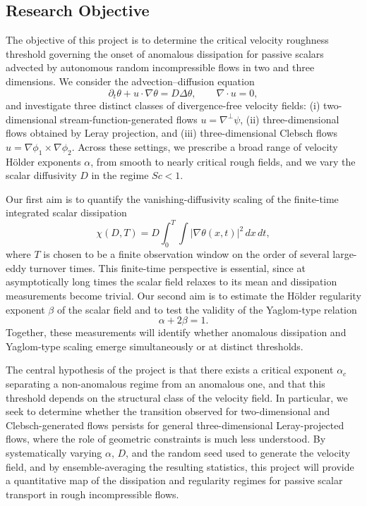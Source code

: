 \subsection*{Research Objective}

The objective of this project is to determine the critical velocity roughness threshold governing the onset of anomalous dissipation for passive scalars advected by autonomous random incompressible flows in two and three dimensions. We consider the advection--diffusion equation
\begin{equation}
\partial_t \theta + u\cdot \nabla \theta = D\Delta \theta,
\qquad \nabla\cdot u = 0,
\end{equation}
and investigate three distinct classes of divergence-free velocity fields: (i) two-dimensional stream-function-generated flows $u=\nabla^\perp\psi$, (ii) three-dimensional flows obtained by Leray projection, and (iii) three-dimensional Clebsch flows $u=\nabla\phi_1\times\nabla\phi_2$. Across these settings, we prescribe a broad range of velocity H\"older exponents $\alpha$, from smooth to nearly critical rough fields, and we vary the scalar diffusivity $D$ in the regime $Sc<1$.

Our first aim is to quantify the vanishing-diffusivity scaling of the finite-time integrated scalar dissipation
\begin{equation}
\chi(D,T)
=
D\int_0^T\int |\nabla\theta(x,t)|^2\,dx\,dt,
\end{equation}
where $T$ is chosen to be a finite observation window on the order of several large-eddy turnover times. This finite-time perspective is essential, since at asymptotically long times the scalar field relaxes to its mean and dissipation measurements become trivial. Our second aim is to estimate the H\"older regularity exponent $\beta$ of the scalar field and to test the validity of the Yaglom-type relation
\begin{equation}
\alpha + 2\beta = 1.
\end{equation}
Together, these measurements will identify whether anomalous dissipation and Yaglom-type scaling emerge simultaneously or at distinct thresholds.

The central hypothesis of the project is that there exists a critical exponent $\alpha_c$ separating a non-anomalous regime from an anomalous one, and that this threshold depends on the structural class of the velocity field. In particular, we seek to determine whether the transition observed for two-dimensional and Clebsch-generated flows persists for general three-dimensional Leray-projected flows, where the role of geometric constraints is much less understood. By systematically varying $\alpha$, $D$, and the random seed used to generate the velocity field, and by ensemble-averaging the resulting statistics, this project will provide a quantitative map of the dissipation and regularity regimes for passive scalar transport in rough incompressible flows.






